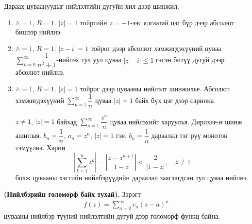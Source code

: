 \begin{exm}

Дараах цуваануудыг нийлэлтийн дугуйн хил дээр шинжил.
    
\end{exm}
\begin{sol}
\begin{enumerate}
    \item  [a)] $\wedge =1$, $R=1$. $|z|=1$ тойргийн $z=-1$-ээс ялгаатай цэг бүр дээр абсолют бишээр нийлнэ. 
    \item [б)] $\wedge =1$, $R=1$. $|z-i|=1$ тойрог дээр абсолют хэмжигдэхүүний цуваа $\sum\limits_{n=0}^\infty \dfrac{1}{n^2+1}$-нийлэх тул уул цуваа $|z-i|\leq 1$ гэсэн битүү дугуй дээр абсолют нийлнэ.
    \item [в)] $\wedge =1$, $R=1$. $|z|=1$  тойрог дээр цувааны нийлэлт шинжилье. Абсолют хэмжигдэхүүний  $\sum\limits_{n=1}^\infty \dfrac{1}{n}$ цуваа $|z|=1$ байх бүх цэг дээр сарнина. 
    
    $z\neq 1$, $|z|=1$ байхад $\sum\limits_{n=1}^\infty \dfrac{z^n}{n}$ цуваа нийлэхийг харуулъя. Дирихле-н шинж ашиглая. $b_n=\dfrac{1}{n}$, $a_n=z^n$, $|z|=1$ гэе. $b_n=\dfrac{1}{n}$ дараалал тэг рүү монотон тэмүүлнэ. Харин 
$$\left|\sum\limits_{k=1}^n z^k \right| = \left|\frac{z-z^{n+1}}{1-z}\right| <\frac{2}{|1-z|}, \quad z\neq 1$$ болж цувааны хэсгийн нийлбэрүүдийн дараалал зааглагдсан тул цуваа нийлнэ. 
\end{enumerate}
\end{sol}
\begin{thm}
\textbf{(Нийлбэрийн голоморф байх тухай). } Зэрэгт
\begin{eqnarray} \label{5.19}
    f(z)=\sum\limits_{n=0}^\infty c_n(z-a)^n 
\end{eqnarray} 
цувааны нийлбэр түүний нийлэлтийн дугуй дээр голоморф функц байна.
\end{thm}
